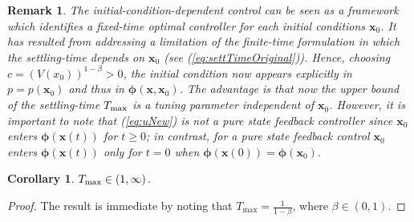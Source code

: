 \documentclass[lettersize,journal]{IEEEtran}
\newtheorem{remark}{Remark}
\newtheorem{corollary}{Corollary}
\begin{document}
\begin{remark}
The initial-condition-dependent control can be seen as a framework which identifies a fixed-time optimal controller for each initial conditions $\bm{x}_0$. It has resulted from addressing a limitation of the finite-time formulation \cite{haddad2015finite} in which the settling-time depends on $\bm{x}_0$ (see (\ref{eq:settTimeOriginal})). Hence, choosing $c = (V(x_0))^{1-\beta}> 0$, the initial condition now appears explicitly in $p = p(\bm{x}_0)$ and thus in $\bm{\phi}(\bm{x}, \bm{x}_0)$. The advantage is that now the upper bound of the settling-time $T_{\textup{max}}$ is a tuning parameter independent of $\bm{x}_0$. However, it is important to note that (\ref{eq:uNew}) is not a pure state feedback controller since $\bm{x}_0$ enters $\bm{\phi}(\bm{x}(t))$ for $t \geq 0$; in contrast, for a pure state feedback control \cite{haddad2015finite} $\bm{x}_0$ enters $\bm{\phi}(\bm{x}(t))$ only for $t = 0$ when $\bm{\phi}(\bm{x}(0)) = \bm{\phi}(\bm{x}_0)$.      
\end{remark}

\begin{corollary}\label{cor:Tmax}
$T_{\textup{max}} \in (1, \infty)$.
\end{corollary}

\begin{proof}
The result is immediate by noting that $T_{\text{max}} = \frac{1}{1 - \beta}$, where $\beta \in (0, 1)$.
\end{proof}
\end{document}
